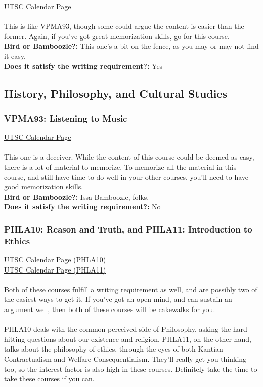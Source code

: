 \documentclass[11pt]{article}
\begin{document}
\href{https://utsc.calendar.utoronto.ca/course/LINA01H3}{UTSC Calendar Page}\\\\
This is like VPMA93, though some could argue the content is easier than the former.  Again, if you've got great memorization skills, go for this course. \\

\textbf{Bird or Bamboozle?:} This one's a bit on the fence, as you may or may not find it easy.\\

\textbf{Does it satisfy the writing requirement?:} Yes

\subsection{History, Philosophy, and Cultural Studies}
\subsubsection{VPMA93: Listening to Music}

\href{https://utsc.calendar.utoronto.ca/course/VPMA93H3}{UTSC Calendar Page}\\\\
This one is a deceiver.  While the content of this course could be deemed as easy, there is a lot of material to memorize.  To memorize all the material in this course, and still have time to do well in your other courses, you'll need to have good memorization skills.\\

\textbf{Bird or Bamboozle?:} Issa Bamboozle, folks.\\

\textbf{Does it satisfy the writing requirement?:} No

\subsubsection{PHLA10: Reason and Truth, and PHLA11: Introduction to Ethics}
\href{https://utsc.calendar.utoronto.ca/course/PHLA10H3}{UTSC Calendar Page (PHLA10)}\\
\href{https://utsc.calendar.utoronto.ca/course/PHLA11H3}{UTSC Calendar Page (PHLA11)}\\\\
Both of these courses fulfill a writing requirement as well, and are possibly two of the easiest ways to get it.  If you've got an open mind, and can sustain an argument well, then both of these courses will be cakewalks for you.\\\\ 
PHLA10 deals with the common-perceived side of Philosophy, asking the hard-hitting questions about our existence and religion.  PHLA11, on the other hand, talks about the philosophy of ethics, through the eyes of both Kantian Contractualism and Welfare Consequentialism.  They'll really get you thinking too, so the interest factor is also high in these courses.  Definitely take the time to take these courses if you can.\\
\end{document}
